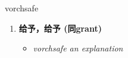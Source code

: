 
\begin{frame}
{\huge vorchsafe}
\begin{center}
\begin{enumerate}\Large
  \item \textbf{给予，给予 (同grant)}
  \begin{itemize}
    \item \em{\Large{vorchsafe an explanation}}
  \end{itemize}
\end{enumerate}
\end{center}
\end{frame}
